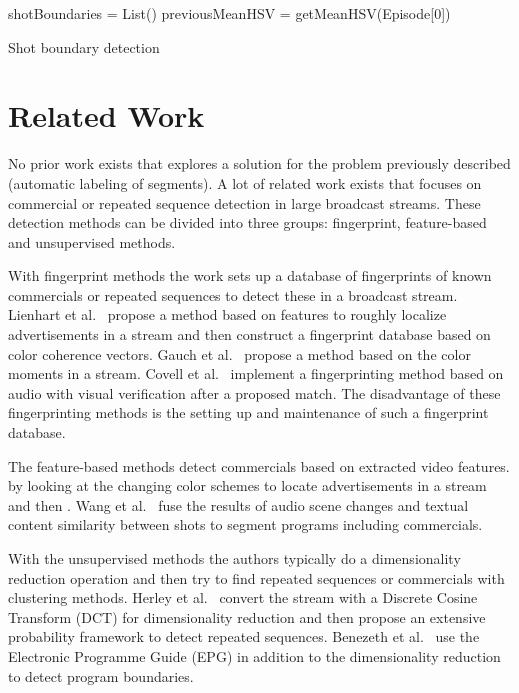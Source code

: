 \documentclass{article}
\begin{document}
\begin{algorithm}[H] \label{algorithm:shotboundary}
	\SetAlgoLined
	shotBoundaries = List()\;
	previousMeanHSV = getMeanHSV(Episode[0])\;
	\caption{Shot boundary detection}
\end{algorithm}

\section{Related Work} \label{relatedwork}

No prior work exists that explores a solution for the problem previously described (automatic labeling of segments).  A lot of related work exists that focuses on commercial or repeated sequence detection in large broadcast streams. These detection methods can be divided into three groups: fingerprint, feature-based and unsupervised methods. 

With fingerprint methods the work sets up a database of fingerprints of known commercials or repeated sequences to detect these in a broadcast stream. Lienhart et al.\ \cite{lienhart1997detection} propose a method based on features to roughly localize advertisements in a stream and then construct a fingerprint database based on color coherence vectors. Gauch et al.\ \cite{gauch2006finding} propose a method based on the color moments in a stream. Covell et al.\ \cite{covell2006advertisement} implement a fingerprinting method based on audio with visual verification after a proposed match. The disadvantage of these fingerprinting methods is the setting up and maintenance of such a fingerprint database. 


The feature-based methods detect commercials based on extracted video features.  by looking at the changing color schemes to locate advertisements in a stream and then . Wang et al.\ \cite{wang2008multimodal} fuse the results of audio scene changes and textual content similarity between shots to segment programs including commercials.

With the unsupervised methods the authors typically do a dimensionality reduction operation and then try to find repeated sequences or commercials with clustering methods. Herley et al.\ \cite{herley2006argos} convert the stream with a Discrete Cosine Transform (DCT) for dimensionality reduction and then propose an extensive probability framework to detect repeated sequences. Benezeth et al.\ \cite{benezeth2010unsupervised} use the Electronic Programme Guide (EPG) in addition to the dimensionality reduction to detect program boundaries.
\end{document}

